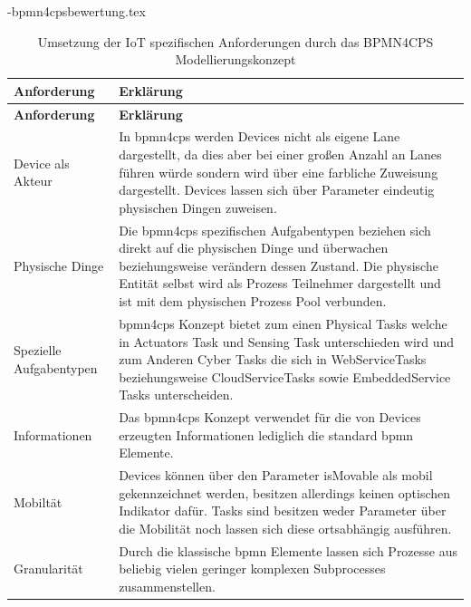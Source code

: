 \documentclass[a4paper, 12pt, twoside, headsepline=true]{scrartcl} %
\begin{document}
\begin{filecontents}{\jobname-bpmn4cpsbewertung.tex}
	\begin{longtable}{P{4cm}|X}
		\caption{Umsetzung der IoT spezifischen Anforderungen durch das BPMN4CPS Modellierungskonzept}\\
		\label{table:evaluierungskriterien}
		\textbf{Anforderung} & \textbf{Erklärung}   \\ \hline
		\endfirsthead %
		\textbf{Anforderung} & \textbf{Erklärung}  \\ \hline
		\endhead %
		Device als Akteur & In \ac{bpmn4cps} werden Devices nicht als eigene Lane dargestellt, da dies aber bei einer großen Anzahl an Lanes führen würde sondern wird über eine farbliche Zuweisung dargestellt. Devices lassen sich über Parameter eindeutig physischen Dingen zuweisen. \\ \hline
		Physische Dinge  & Die \ac{bpmn4cps} spezifischen Aufgabentypen beziehen sich direkt auf die physischen Dinge und überwachen beziehungsweise verändern dessen Zustand. Die physische Entität selbst wird als Prozess Teilnehmer dargestellt und ist mit dem physischen Prozess Pool verbunden.\\ \hline
		Spezielle Aufgabentypen & \ac{bpmn4cps} Konzept bietet zum einen Physical Tasks welche in Actuators Task und Sensing Task unterschieden wird und zum Anderen Cyber Tasks die sich in WebServiceTasks beziehungsweise CloudServiceTasks sowie EmbeddedService Tasks unterscheiden.\\ \hline
		Informationen  & Das \ac{bpmn4cps} Konzept verwendet für die von Devices erzeugten Informationen lediglich die standard \ac{bpmn} Elemente.\\ \hline
		Mobiltät & Devices können über den Parameter isMovable als mobil gekennzeichnet werden, besitzen allerdings keinen optischen Indikator dafür. Tasks sind besitzen weder Parameter über die Mobilität noch lassen sich diese ortsabhängig ausführen.\\ \hline
		Granularität & Durch die klassische \ac{bpmn} Elemente lassen sich Prozesse aus beliebig vielen geringer komplexen Subprocesses zusammenstellen.\\
	\end{longtable}
\end{filecontents}
\end{document}
